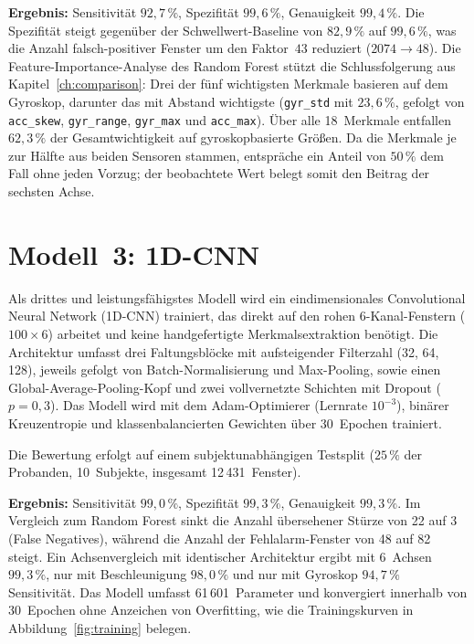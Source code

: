 \documentclass[11pt,a4paper,oneside]{report}
\begin{document}
\textbf{Ergebnis:} Sensitivität $92{,}7\,\%$, Spezifität $99{,}6\,\%$,
Genauigkeit $99{,}4\,\%$. Die Spezifität steigt gegenüber der
Schwellwert-Baseline von $82{,}9\,\%$ auf $99{,}6\,\%$, was die Anzahl
falsch-positiver Fenster um den Faktor~$43$ reduziert ($2074 \rightarrow 48$). Die
Feature-Importance-Analyse des Random Forest stützt die
Schlussfolgerung aus Kapitel~\ref{ch:comparison}: Drei der fünf
wichtigsten Merkmale basieren auf dem Gyroskop, darunter das mit
Abstand wichtigste (\texttt{gyr\_std} mit $23{,}6\,\%$, gefolgt von
\texttt{acc\_skew}, \texttt{gyr\_range}, \texttt{gyr\_max} und
\texttt{acc\_max}). Über alle 18~Merkmale entfallen $62{,}3\,\%$ der
Gesamtwichtigkeit auf gyroskopbasierte Größen. Da die Merkmale je
zur Hälfte aus beiden Sensoren stammen, entspräche ein Anteil von
$50\,\%$ dem Fall ohne jeden Vorzug; der beobachtete Wert belegt
somit den Beitrag der sechsten Achse.

\section{Modell~3: 1D-CNN}
\label{sec:cnn}

Als drittes und leistungsfähigstes Modell wird ein eindimensionales
Convolutional Neural Network (1D-CNN) trainiert, das direkt auf den
rohen 6-Kanal-Fenstern ($100 \times 6$) arbeitet und keine
handgefertigte Merkmalsextraktion benötigt. Die Architektur umfasst
drei Faltungsblöcke mit aufsteigender Filterzahl (32, 64, 128),
jeweils gefolgt von Batch-Normalisierung und Max-Pooling, sowie einen
Global-Average-Pooling-Kopf und zwei vollvernetzte Schichten mit
Dropout ($p = 0{,}3$). Das Modell wird mit dem Adam-Optimierer
(Lernrate $10^{-3}$), binärer Kreuzentropie und klassenbalancierten
Gewichten über 30~Epochen trainiert.

Die Bewertung erfolgt auf einem subjektunabhängigen Testsplit
($25\,\%$ der Probanden, 10~Subjekte, insgesamt 12\,431~Fenster).

\textbf{Ergebnis:} Sensitivität $99{,}0\,\%$, Spezifität $99{,}3\,\%$,
Genauigkeit $99{,}3\,\%$. Im Vergleich zum Random Forest sinkt die
Anzahl übersehener Stürze von 22 auf 3 (False Negatives), während
die Anzahl der Fehlalarm-Fenster von 48 auf 82 steigt. Ein
Achsenvergleich mit identischer Architektur ergibt mit 6~Achsen
$99{,}3\,\%$, nur mit Beschleunigung $98{,}0\,\%$ und nur mit Gyroskop
$94{,}7\,\%$ Sensitivität.
Das Modell umfasst 61\,601~Parameter und konvergiert
innerhalb von 30~Epochen ohne Anzeichen von Overfitting, wie die
Trainingskurven in Abbildung~\ref{fig:training} belegen.
\end{document}
